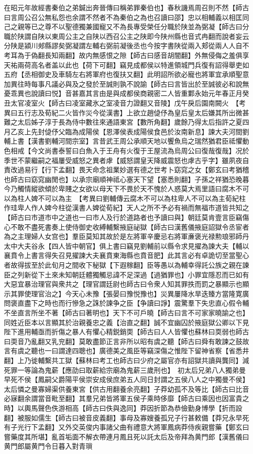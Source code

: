 在昭元年故經書秦伯之弟鍼出奔晉傳曰稱弟罪秦伯也】春秋譏焉周召則不然【師古曰言周公召公無私怨也余謂不然者不為秦伯之為也召讀曰邵】忠以相輔義以相匡同己之親等已之尊不以聖德獨兼國寵又不為長專受榮任分職於陕並為弼凝【師古曰分職於陕謂自陕以東周公主之自陕以西召公主之陕即今陕州縣也音式冉翻而說者妄云分陕是潁川郟縣謬矣弼凝謂左輔右弼前凝後丞也今按字書陕從兩入郏從兩人人自不考耳為于偽翻長知兩翻】故内無感恨之隙【師古曰感音胡闇翻】外無侵侮之羞俱享天祐兩荷高名者盖以此也【荷下可翻】竊見成都侯以特進領城門兵復有詔得舉吏如五府【丞相御史及車騎左右將軍府也復扶又翻】此明詔所欲必寵也將軍宜承順聖意加異往時每事凡議必與及之發於至誠則孰不說諭【師古曰言皆出於至誠彼必和說無憂乖異也說讀曰悦】音甚嘉其言由是與成都侯商親密二人皆重鄴永始元年春正月癸丑太官凌室火【師古曰凌室藏氷之室凌音力證翻又音陵】戊午戾后園南闕火　【考異曰五行志及荀紀二火皆作災今從漢書】上欲立趙偼伃為皇后皇太后嫌其所出微甚難之太后姊子淳于長為侍中數往來通語東宮【數所角翻】歲餘乃得太后指許之夏四月乙亥上先封偼伃父臨為成陽侯【恩澤侯表成陽侯食邑於汝南新息】諫大夫河間劉輔上書【漢書劉輔河間宗室】言昔武王周公承順天地以饗魚烏之瑞然猶君臣祗懼動色相戒【今文尚書泰誓曰白魚入于王舟有火復于王屋流為烏周公曰復哉復哉】况於季世不蒙繼嗣之福屢受威怒之異者虖【威怒謂皇天降威震怒也虖古乎字】雖夙夜自責改過易行【行下孟翻】畏天命念祖業妙選有德之世考卜窈窕之女【鄭玄曰考猶稽也師古曰窈窕幽閒也】以承宗廟順神祗心塞天下望【塞悉則翻】子孫之祥猶恐晚暮今乃觸情縱欲傾於卑賤之女欲以母天下不畏於天不愧於人惑莫大焉里語曰腐木不可以為柱人婢不可以為主　【考異曰劉輔傳云腐木不可以為柱卑人不可以為主荀紀柱作珪卑人作人婢今柱從漢書人婢從荀紀】天人之所不予必有禍而無福市道皆共知之【師古曰市道市中之道也一曰市人及行於道路者也予讀曰與】朝廷莫肯壹言臣竊傷心不敢不盡死書奏上使侍御史收縛輔繫掖庭祕獄【師古曰漢舊儀掖庭詔獄令丞宦者為之主理婦人女宫也】羣臣莫知其故於是左將軍辛慶忌右將軍亷褒光禄勲琅邪師丹太中大夫谷永【四人皆中朝官】俱上書曰竊見劉輔前以縣令求見擢為諫大夫【輔以襄賁令上書言得失召見擢諫大夫襄賁東海縣也賁音肥】此其言必有卓詭切至當聖心者故得拔至於此旬月之間收下秘獄【下遐稼翻】臣等愚以為輔幸得託公族之親在諫臣之列新從下土來未知朝廷體獨觸忌諱不足深過【過猶罪也】小罪宜隱忍而已如有大惡宜暴治理官與衆共之【理官謂廷尉也師古曰令衆人知其罪抶而罰之暴顯示也顯示其罪使理官治之】今天心未豫【張晏曰豫悦豫也】災異屢降水旱迭臻方當隆寛廣問褒直盡下之時也而行慘急之誅於諫争之臣【争讀曰諍】震驚羣下失忠直心假令輔不坐直言所坐不著【師古曰著明也】天下不可戶曉【師古曰言不可家家曉諭之也】同姓近臣本以言顯其於治親養忠之義【治直之翻】誠不宜幽囚於掖庭獄公卿以下見陛下進用輔亟而折傷之暴人有懼心精鋭銷耎【師古曰人人皆懼也蘇林曰耎弱也師古曰耎音乃亂翻又乳兖翻】莫敢盡節正言非所以昭有虞之聽【師古曰舜有敢諫之鼓故言有虞之聽也一曰謂達四聰也】廣德美之風臣等竊深傷之惟陛下留神省察【省悉井翻】上乃徙輔繫共工獄【蘇林曰考工也師古曰少府之屬官亦有詔獄共讀與龔同】減死罪一等論為鬼薪【應劭曰取薪給宗廟為鬼薪三歲刑也】　初太后兄弟八人獨弟曼早死不侯【鳳嗣父爵陽平侯崇安成侯庶弟五人同日封謂之五侯八人之中獨曼不侯】太后憐之曼寡婦渠供養東宮【供古用翻養余亮翻】子莽幼孤不及等比【師古曰比音必寐翻余謂當音毗至翻】其羣兄弟皆將軍五侯子乘時侈靡【師古曰乘因也因富貴之時】以輿馬聲色佚游相高【師古曰佚與逸同】莽因折節為恭儉勤身博學【折而設翻】被服如儒生【師古曰被音皮義翻】事母及寡嫂養孤兄子行甚敕備【莽兄永早死有子光行下孟翻】又外交英俊内事諸父曲有禮意大將軍鳳病莽侍疾親嘗藥【鄭玄曰嘗藥度其所堪】亂首垢面不解衣帶連月鳳且死以託太后及帝拜為黄門郎【漢舊儀曰黄門郎屬黄門令日暮入對青瑣
